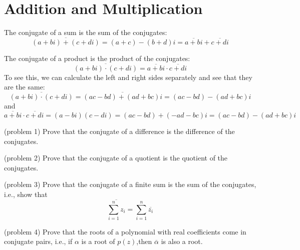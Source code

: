 \documentclass[handout]{ximera}
\begin{document}
\section{Addition and Multiplication}

The conjugate of a sum is the sum of the conjugates:
\[
\overline{(a+bi) + (c+di)} = (a+c) - (b+d)i = \overline{a+bi }+\overline{c+di}
\]


The conjugate of a product is the product of the conjugates:
\[
\overline{(a+bi) \cdot (c+di)} = \overline{a+bi }\cdot\overline{c+di}
\]
To see this, we can calculate the left and right sides separately and see that they are the same:
\[
\overline{(a+bi) \cdot (c+di)}= \overline{(ac-bd) + (ad+bc)i} = (ac-bd) - (ad+bc)i
\]
and
\[
\overline{a+bi }\cdot\overline{c+di} = (a-bi)(c-di) = (ac-bd) + (-ad-bc)i = (ac-bd) - (ad +bc)i
\]


\begin{problem}(problem 1) Prove that the conjugate of a difference is the difference of the conjugates.
\end{problem}


\begin{problem}(problem 2) Prove that the conjugate of a quotient is the quotient of the conjugates.
\end{problem}

\begin{problem}(problem 3) Prove that the conjugate of a finite sum is the sum of the conjugates, i.e., show that
\[
\overline{\sum_{i=1}^n z_i} =  \sum_{i=1}^n \overline{z_i}
\]

\end{problem}
\begin{problem}(problem 4) Prove that the roots of a polynomial with real coefficients come in conjugate pairs, i.e., if $\alpha$ is a root of $p(z)$,then 
$\overline{\alpha}$ is also a root.

\end{problem}
\end{document}
